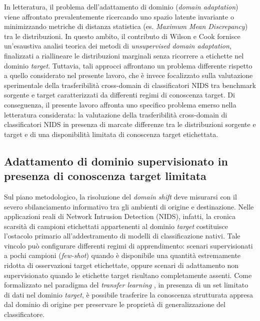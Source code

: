 In letteratura, il problema dell'adattamento di dominio (\textit{domain adaptation}) viene affrontato prevalentemente ricercando uno spazio latente invariante o minimizzando metriche di distanza statistica (es. \textit{Maximum Mean Discrepancy}) tra le distribuzioni. 
In questo ambito, il contributo di Wilson e Cook \cite{wilson2020} fornisce un'esaustiva analisi teorica dei metodi di \textit{unsupervised domain adaptation}, finalizzati a riallineare le distribuzioni marginali senza ricorrere a etichette nel dominio \textit{target}. 
Tuttavia, tali approcci affrontano un problema differente rispetto a quello considerato nel presente lavoro, che è invece focalizzato sulla valutazione sperimentale della trasferibilità cross-domain di classificatori NIDS tra benchmark sorgente e target caratterizzati da differenti regimi di conoscenza target.
Di conseguenza, il presente lavoro affronta uno specifico problema emerso nella letteratura considerata: la valutazione della trasferibilità cross-domain di classificatori NIDS in presenza di marcate differenze tra le distribuzioni sorgente e target e di una disponibilità limitata di conoscenza target etichettata.

\subsection{Adattamento di dominio supervisionato in presenza di conoscenza target limitata}
\label{subsec:supervised_da_nids}

Sul piano metodologico, la risoluzione del \textit{domain shift} deve misurarsi con il severo sbilanciamento informativo tra gli ambienti di origine e destinazione. 
Nelle applicazioni reali di Network Intrusion Detection (NIDS), infatti, la cronica scarsità di campioni etichettati appartenenti al dominio \textit{target} costituisce l'ostacolo primario all'addestramento di modelli di classificazione nativi. 
Tale vincolo può configurare differenti regimi di apprendimento: scenari supervisionati a pochi campioni (\textit{few-shot}) quando è disponibile una quantità estremamente ridotta di osservazioni target etichettate, oppure scenari di adattamento non supervisionato quando le etichette target risultano completamente assenti.
Come formalizzato nel paradigma del \textit{transfer learning} \cite{pan2010}, in presenza di un set limitato di dati nel dominio \textit{target}, è possibile trasferire la conoscenza strutturata appresa dal dominio di origine per preservare le proprietà di generalizzazione del classificatore.

